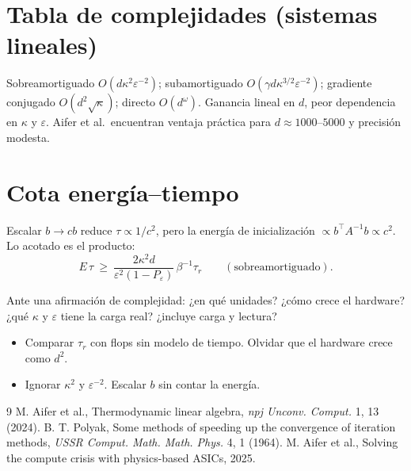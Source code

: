 \documentclass[11pt,a4paper]{article}
\begin{document}
\section{Tabla de complejidades (sistemas lineales)}
Sobreamortiguado $O(d\kappa^2\varepsilon^{-2})$; subamortiguado $O(\gamma d\kappa^{3/2}\varepsilon^{-2})$; gradiente conjugado $O(d^2\sqrt\kappa)$; directo $O(d^\omega)$.
Ganancia lineal en $d$, peor dependencia en $\kappa$ y $\varepsilon$. Aifer et al.\ encuentran ventaja práctica para $d\approx1000$--$5000$ y precisión modesta.

\section{Cota energía--tiempo}
Escalar $b\to cb$ reduce $\tau\propto1/c^2$, pero la energía de inicialización $\propto b^\top A^{-1}b\propto c^2$. Lo acotado es el producto:
\[E\,\tau\ \ge\ \frac{2\kappa^2d}{\varepsilon^2(1-P_\varepsilon)}\,\beta^{-1}\tau_r\qquad(\text{sobreamortiguado}).\]

\begin{aplicacion}
Ante una afirmación de complejidad: ¿en qué unidades? ¿cómo crece el hardware? ¿qué $\kappa$ y $\varepsilon$ tiene la carga real? ¿incluye carga y lectura?
\end{aplicacion}

\begin{error}
\begin{itemize}[nosep]
\item Comparar $\tau_r$ con flops sin modelo de tiempo. \quad Olvidar que el hardware crece como $d^2$.
\item Ignorar $\kappa^2$ y $\varepsilon^{-2}$. \quad Escalar $b$ sin contar la energía.
\end{itemize}
\end{error}

\begin{thebibliography}{9}\small
{} M. Aifer et al., Thermodynamic linear algebra, \emph{npj Unconv. Comput.} 1, 13 (2024).
 B. T. Polyak, Some methods of speeding up the convergence of iteration methods, \emph{USSR Comput. Math. Math. Phys.} 4, 1 (1964).
 M. Aifer et al., Solving the compute crisis with physics-based ASICs, 2025.
\end{thebibliography}
\end{document}
